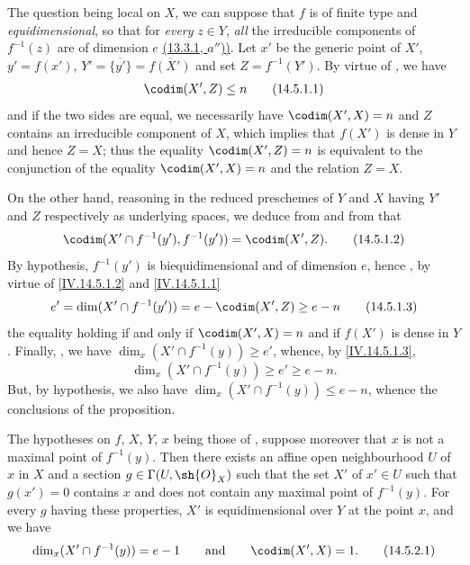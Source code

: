 The question being local on $X$, we can suppose that $f$ is of finite type and \emph{equidimensional}, so that for \emph{every} $z\in Y$, \emph{all} the irreducible components of $f^{-1}(z)$ are of dimension $e$ \hyperref[IV.13.3.1]{(13.3.1, $a''$))}.
Let $x'$ be the generic point of $X'$, $y'=f(x')$, $Y'=\overline{\{y'\}}=\overline{f(X')}$ and set $Z=f^{-1}(Y')$.
By virtue of , we have
\begin{equation}
  \codim(X',Z)\leq n
  \tag{14.5.1.1}\label{IV.14.5.1.1}
\end{equation}
and if the two sides are equal, we necessarily have $\codim(X',X)=n$ and $Z$ contains an irreducible component of $X$, which implies  that $f(X')$ is dense in $Y$ and hence $Z=X$; thus the equality $\codim(X',Z)=n$ is equivalent to the conjunction of the equality $\codim(X',X)=n$ and the relation $Z=X$.

On the other hand, reasoning in the reduced preschemes of $Y$ and $X$ having $Y'$ and $Z$ respectively as underlying spaces, we deduce from  and from  that
\begin{equation}
  \codim(X'\cap f^{-1}(y'),f^{-1}(y'))=\codim(X',Z).
  \tag{14.5.1.2}\label{IV.14.5.1.2}
\end{equation}
By hypothesis, $f^{-1}(y')$ is biequidimensional  and of dimension $e$, hence , by virtue of \eqref{IV.14.5.1.2} and \eqref{IV.14.5.1.1}
\begin{equation}
  e'=\dim(X'\cap f^{-1}(y'))=e-\codim(X',Z)\geq e-n
  \tag{14.5.1.3}\label{IV.14.5.1.3}
\end{equation}
the equality holding if and only if $\codim(X',X)=n$ and if $f(X')$ is dense in $Y$.
Finally, , we have $\dim_x(X'\cap f^{-1}(y))\geq e'$, whence, by \eqref{IV.14.5.1.3},
\begin{equation}
  \dim_x(X'\cap f^{-1}(y))\geq e'\geq e-n.
  \tag{14.5.1.4}\label{IV.14.5.1.4}
\end{equation}
But, by hypothesis, we also have $\dim_x(X'\cap f^{-1}(y))\leq e-n$, whence the conclusions of the proposition.

\begin{corollary}[14.5.2]
\label{IV.14.5.2}
The hypotheses on $f$, $X$, $Y$, $x$ being those of , suppose moreover that $x$ is not a maximal point of $f^{-1}(y)$.
Then there exists an affine open neighbourhood $U$ of $x$ in $X$ and a section $g\in\Gamma(U,\sh{O}_X)$ such that the set $X'$ of $x'\in U$ such that $g(x')=0$ contains $x$ and does not contain any maximal point of $f^{-1}(y)$.
For every $g$ having these properties, $X'$ is equidimensional over $Y$ at the point $x$, and we have
\begin{equation}
  \dim_x(X'\cap f^{-1}(y))=e-1 \qquad\text{and}\qquad \codim(X',X)=1.
  \tag{14.5.2.1}\label{IV.14.5.2.1}
\end{equation}
\end{corollary}

